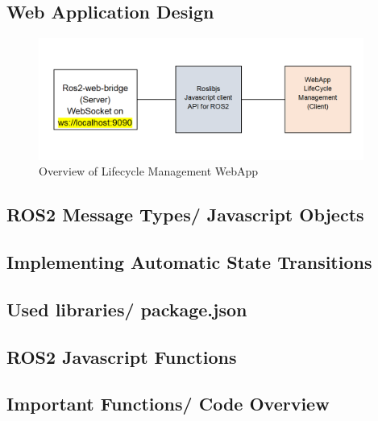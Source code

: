 \subsection{Web Application Design}
	\begin{figure}[H]
		\centering
		\includegraphics[width=0.95\textwidth]{"Bilder/webapp-design.png"}
		\caption{Overview of Lifecycle Management WebApp}
		\label{fig:Background:WebappDesign}					
	\end{figure}

\subsection{ROS2 Message Types/ Javascript Objects}

\subsection{Implementing Automatic State Transitions}

\subsection{Used libraries/ package.json}

\subsection{ROS2 Javascript Functions}

\subsection{Important Functions/ Code Overview}

